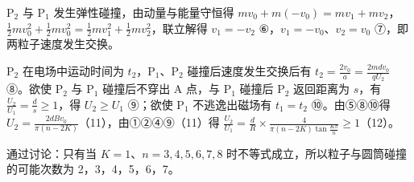 \documentclass[\gkver]{gaokaozhenti}
\begin{document}
\begin{enumerate}
{$\mathrm{P}_{2}$ 与 $\mathrm{P}_{1}$ 发生弹性碰撞，由动量与能量守恒得 $mv_{0}+m(-v_{0})=mv_{1}+mv_{2}$，$\frac{1}{2}mv_{0}^{2}+\frac{1}{2}mv_{0}^{2}=\frac{1}{2}mv_{1}^{2}+\frac{1}{2}mv_{2}^{2}$，联立解得 $v_{1}=-v_{2}$ ⑥，$v_{1}=-v_{0}$、$v_{2}=v_{0}$ ⑦，即两粒子速度发生交换。

$\mathrm{P}_{2}$ 在电场中运动时间为 $t_{2}$，$\mathrm{P}_{1}$、$\mathrm{P}_{2}$ 碰撞后速度发生交换后有 $t_{2}=\frac{2v_{0}}{a}=\frac{2mdv_{0}}{qU_{2}}$ ⑧。欲使 $\mathrm{P}_{2}$ 与 $\mathrm{P}_{1}$ 碰撞后不穿出 A 点，与 $\mathrm{P}_{1}$ 碰撞后 $\mathrm{P}_{2}$ 返回距离为 $s$，有 $\frac{U_{2}}{U_{1}}=\frac{d}{s}\geq1$，得 $U_{2}\geq U_{1}$ ⑨；欲使 $\mathrm{P}_{1}$ 不逃逸出磁场有 $t_{1}=t_{2}$ ⑩。由⑤⑧⑩得 $U_{2}=\frac{2dBv_{0}}{\pi(n-2K)}$（11），由①②④⑨（11）得 $\frac{U_{2}}{U_{1}}=\frac{d}{R}\times\frac{4}{\pi(n-2K)\tan\frac{K\pi}{n}}\geq1$（12）。

通过讨论：只有当 $K=1$、$n=3,4,5,6,7,8$ 时不等式成立，所以粒子与圆筒碰撞的可能次数为 2，3，4，5，6，7。
}

\end{enumerate}
\end{document}
